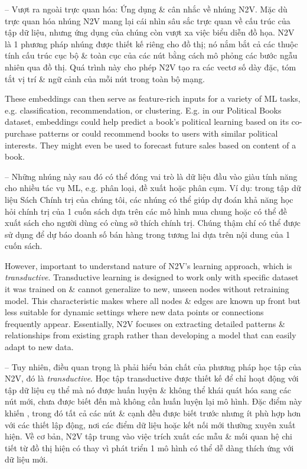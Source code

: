 \documentclass{article}
\begin{document}
\begin{itemize}
\begin{itemize}
\begin{itemize}
           -- {\sf Vượt ra ngoài trực quan hóa: Ứng dụng \& cân nhắc về nhúng N2V.} Mặc dù trực quan hóa nhúng N2V mang lại cái nhìn sâu sắc trực quan về cấu trúc của tập dữ liệu, nhưng ứng dụng của chúng còn vượt xa việc biểu diễn đồ họa. N2V là 1 phương pháp nhúng được thiết kế riêng cho đồ thị; nó nắm bắt cả các thuộc tính cấu trúc cục bộ \& toàn cục của các nút bằng cách mô phỏng các bước ngẫu nhiên qua đồ thị. Quá trình này cho phép N2V tạo ra các vectơ số dày đặc, tóm tắt vị trí \& ngữ cảnh của mỗi nút trong toàn bộ mạng.

           These embeddings can then serve as feature-rich inputs for a variety of ML tasks, e.g. classification, recommendation, or clustering. E.g. in our Political Books dataset, embeddings could help predict a book's political learning based on its co-purchase patterns or could recommend books to users with similar political interests. They might even be used to forecast future sales based on content of a book.

           -- Những nhúng này sau đó có thể đóng vai trò là dữ liệu đầu vào giàu tính năng cho nhiều tác vụ ML, e.g. phân loại, đề xuất hoặc phân cụm. Ví dụ: trong tập dữ liệu Sách Chính trị của chúng tôi, các nhúng có thể giúp dự đoán khả năng học hỏi chính trị của 1 cuốn sách dựa trên các mô hình mua chung hoặc có thể đề xuất sách cho người dùng có cùng sở thích chính trị. Chúng thậm chí có thể được sử dụng để dự báo doanh số bán hàng trong tương lai dựa trên nội dung của 1 cuốn sách.

           However, important to understand nature of N2V's learning approach, which is {\it transductive}. Transductive learning is designed to work only with specific dataset it was trained on \& cannot generalize to new, unseen nodes without retraining model. This characteristic makes  where all nodes \& edges are known up front but less suitable for dynamic settings where new data points or connections frequently appear. Essentially, N2V focuses on extracting detailed patterns \& relationships from existing graph rather than developing a model that can easily adapt to new data.

           -- Tuy nhiên, điều quan trọng là phải hiểu bản chất của phương pháp học tập của N2V, đó là {\it transductive}. Học tập transductive được thiết kế để chỉ hoạt động với tập dữ liệu cụ thể mà nó được huấn luyện \& không thể khái quát hóa sang các nút mới, chưa được biết đến mà không cần huấn luyện lại mô hình. Đặc điểm này khiến , trong đó tất cả các nút \& cạnh đều được biết trước nhưng ít phù hợp hơn với các thiết lập động, nơi các điểm dữ liệu hoặc kết nối mới thường xuyên xuất hiện. Về cơ bản, N2V tập trung vào việc trích xuất các mẫu \& mối quan hệ chi tiết từ đồ thị hiện có thay vì phát triển 1 mô hình có thể dễ dàng thích ứng với dữ liệu mới.


\end{itemize}
\end{itemize}
\end{itemize}
\end{document}

